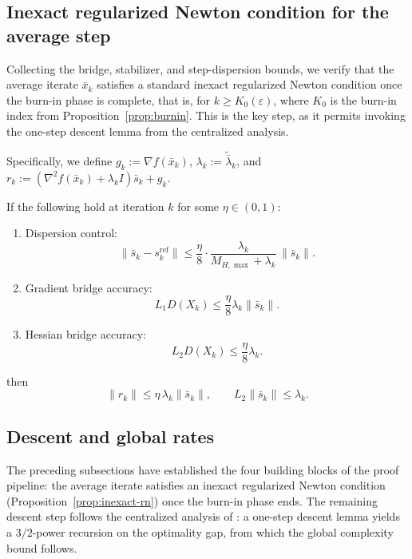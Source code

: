 \documentclass[review,onefignum,onetabnum]{siamart171218}
\begin{document}
	\subsection{Inexact regularized Newton condition for the average step}\label{ssec:inexact}
	Collecting the bridge, stabilizer, and step-dispersion bounds, we
	verify that the average iterate $\bar x_k$ satisfies a standard
	inexact regularized Newton condition once the burn-in phase
	is complete, that is, for $k\ge K_0(\varepsilon)$, where $K_0$ is the
	burn-in index from Proposition~\ref{prop:burnin}.
	This is the key step, as it permits invoking the one-step descent
	lemma from the centralized analysis.
	
	Specifically, we define $g_k:=\nabla f(\bar x_k)$, $\lambda_k:=\tilde{\bar\lambda}_k$, and $r_k:=(\nabla^2 f(\bar x_k)+\lambda_k I)\bar s_k+g_k$.
	
	\begin{proposition}\label{prop:inexact-rn}
		If the following hold at iteration $k$ for some $\eta\in(0,1)$:
		\begin{enumerate}[leftmargin=1.2em,itemsep=2pt]
			\item Dispersion control:
			\[
			\|\bar s_k-s_k^{\mathrm{ref}}\|\le \frac{\eta}{8}\cdot \frac{\lambda_k}{M_{H,\max}+\lambda_k}\,\|\bar s_k\|.
			\]
			\item Gradient bridge accuracy:
			\[
			L_1D(X_k)\le \frac{\eta}{8}\lambda_k\|\bar s_k\|.
			\]
			\item Hessian bridge accuracy:
			\[
			L_2D(X_k)\le \frac{\eta}{8}\lambda_k.
			\]
		\end{enumerate}
		then
		\[
		\|r_k\|\le \eta\,\lambda_k\|\bar s_k\|,
		\qquad
		L_2\|\bar s_k\|\le \lambda_k.
		\]
	\end{proposition}
	
	\subsection{Descent and global rates}\label{ssec:descent}
	The preceding subsections have established the four building blocks
	of the proof pipeline: the average
	iterate satisfies an inexact regularized Newton condition
	(Proposition~\ref{prop:inexact-rn}) once the burn-in phase ends.
	The remaining descent step follows the centralized analysis of
	\citet{mishchenko2023rn}: a one-step descent lemma yields a
	$3/2$-power recursion on the optimality gap, from which the global
	complexity bound follows.
	
\end{document}
